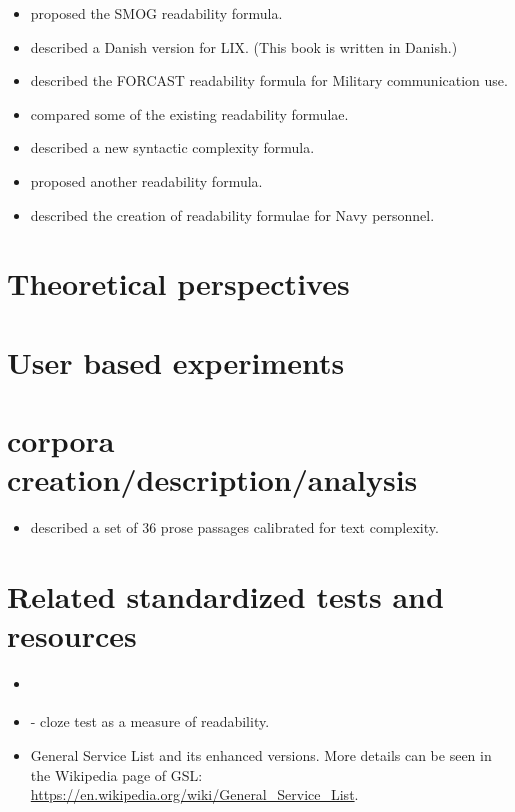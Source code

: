 \documentclass[a4paper,12pt]{report}
\begin{document}
\begin{itemize}
\item \cite{McLaughlin-69} proposed the SMOG readability formula.

\item \cite{Jakobsen-71} described a Danish version for LIX. (This book is written in Danish.)

\item \cite{Caylor.Sticht.ea-73} described the FORCAST readability formula for Military communication use.

\item \cite{McLaughlin-74} compared some of the existing readability formulae.

\item \cite{Granowsky.Botel-74} described a new syntactic complexity formula.

\item \cite{Coleman.Liau-75} proposed another readability formula.

\item \cite{Kincaid.Fishburne.ea-75} described the creation of readability formulae for Navy personnel.

\end{itemize}


\section{Theoretical perspectives}

\section{User based experiments}

\section{corpora creation/description/analysis}

\begin{itemize}
\item \cite{Miller.Coleman-67} described a set of 36 prose passages calibrated for text complexity. 

\end{itemize}

\section{Related standardized tests and resources}

\begin{itemize}
\item \cite{McCall.Crabbs-26}

\item \cite{Taylor-53} - cloze test as a measure of readability.

\item General Service List \cite{West-53} and its enhanced versions. More details can be seen in the Wikipedia page of GSL: \url{https://en.wikipedia.org/wiki/General_Service_List}. 
\end{itemize}
\end{document}
